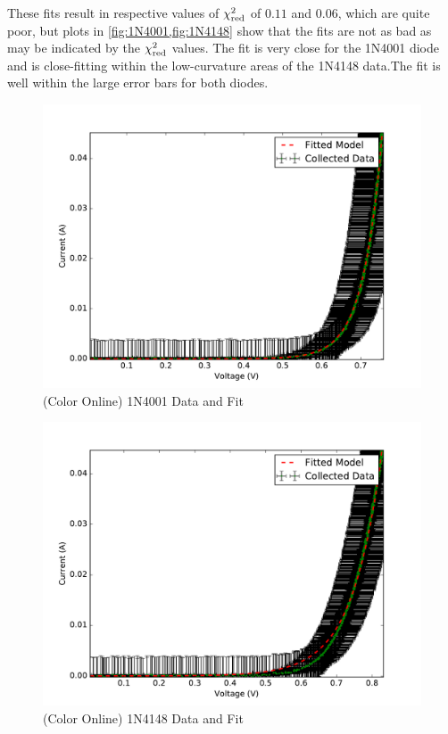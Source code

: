 \documentclass[reprint]{revtex4-1}
\begin{document}
These fits result in respective values of $\chi^2_{\rm{red}}$ of $0.11$ and $0.06$, which are quite poor, but plots in \cref{fig:1N4001,fig:1N4148} show that the fits are not as bad as may be indicated by the $\chi^2_{\rm{red}}$ values. The fit is very close for the \textsc{1N4001} diode and is close-fitting within the low-curvature areas of the \textsc{1N4148} data.The fit is well within the large error bars for both diodes.

\begin{figure}
\includegraphics[width=\columnwidth]{../resources/plots/diode1_1n4001.pdf}
\caption{(Color Online) \textsc{1N4001} Data and Fit}
\label{fig:1N4001}
\end{figure}

\begin{figure}
\includegraphics[width=\columnwidth]{../resources/plots/diode2_1n4148.pdf}
\caption{(Color Online) \textsc{1N4148} Data and Fit}
\label{fig:1N4148}
\end{figure}
\end{document}
